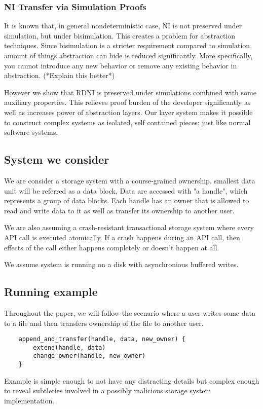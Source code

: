 \documentclass[onecolumn]{paper}
\begin{document}
\subsubsection*{NI Transfer via Simulation Proofs}
It is known that, in general nondeterministic case, NI is not preserved under simulation, but under bisimulation. This creates a problem for abstraction techniques. Since bisimulation is a stricter requirement compared to simulation, amount of things abstraction can hide is reduced significantly. More specifically, you cannot introduce any new behavior or remove any existing behavior in abstraction. (*Explain this better*)

However we show that RDNI is preserved under simulations combined with some auxiliary properties. This relieves proof burden of the developer significantly as well as increases power of abstraction layers. Our layer system makes it possible to construct complex systems as isolated, self contained pieces; just like normal software systems.







\subsection*{System we consider}
We are consider a storage system with a course-grained ownership. smallest data unit will be referred as a data block, Data are accessed with "a handle", which represents a group of data blocks. Each handle has an owner that is allowed to read and write data to it as well as transfer its ownership to another user.

We are also assuming a crash-resistant transactional storage system where every API call is executed atomically. If a crash happens during an API call, then effects of the call either happens completely or doesn't happen at all.

We assume system is running on a disk with asynchronious buffered writes. 

\subsection*{Running example}
Throughout the paper, we will follow the scenario where a user writes some data to a file and then transfers ownership of the file to another user.
\begin{verbatim}
	append_and_transfer(handle, data, new_owner) {
		extend(handle, data)
		change_owner(handle, new_owner)
	}
\end{verbatim}
Example is simple enough to not have any distracting details but complex enough to reveal subtleties involved in a possibly malicious storage system implementation.\\
\end{document}
